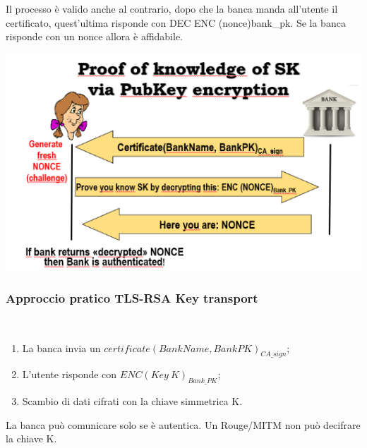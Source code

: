 \documentclass{book}
\theoremstyle{remark}
\begin{document}
Il processo è valido anche al contrario, dopo che la banca manda all'utente il certificato, quest'ultima risponde con DEC ENC (nonce)bank\_pk\@. Se la banca risponde con un nonce allora è affidabile\@.
\begin{center}
	\includegraphics[scale=0.6]{2021-12-06-10-47-59.png}
\end{center}
\subsubsection{Approccio pratico TLS-RSA Key transport}\mbox{}\\
\begin{enumerate}
	\item La banca invia un \(certificate(BankName,BankPK)_{CA\_sign}\);\@
	\item L'utente risponde con \(ENC(Key\ K)_{Bank\_PK}\);\@
	\item Scambio di dati cifrati con la chiave simmetrica K\@.
\end{enumerate}
La banca può comunicare solo se è autentica\@. Un Rouge/MITM non può decifrare la chiave K\@.
\end{document}
